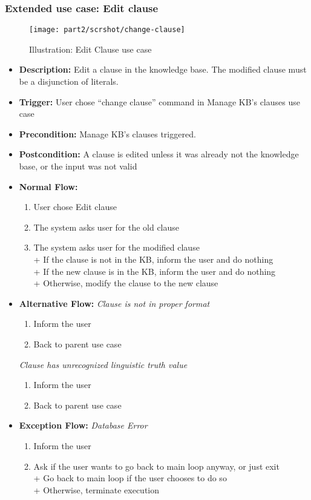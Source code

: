 \documentclass[../gr-final.tex]{subfiles}
\begin{document}
\subsubsection{Extended use case: Edit clause}
\begin{figure}[H]
  \centering
  \texttt{[image: part2/scrshot/change-clause]}
  \caption{Illustration: Edit Clause use case}
\end{figure}
\begin{itemize}
  \item {\bfseries Description:} Edit a clause in the
    knowledge base. The modified clause must be a disjunction of literals.
  \item {\bfseries Trigger:} User chose ``change clause'' command in
    Manage KB's clauses use case
  \item {\bfseries Precondition:} Manage KB's clauses triggered.
  \item {\bfseries Postcondition:} A clause is edited unless it
    was already not the knowledge base, or the input was not
    valid
  \item {\bfseries Normal Flow:}
    \begin{enumerate}
      \item User chose Edit clause
      \item The system asks user for the old clause\\
      \item The system asks user for the modified clause\\
        \indent + If the clause is not in the KB, inform the
        user and do nothing   \\
        \indent + If the new clause is in the KB, inform the user
        and do nothing\\
        \indent + Otherwise, modify the clause to the new clause        
    \end{enumerate}
  \item {\bfseries Alternative Flow:}
    {\em Clause is not in proper format}
    \begin{enumerate}
      \item Inform the user
      \item Back to parent use case
    \end{enumerate}
    {\em Clause has unrecognized linguistic truth value}
    \begin{enumerate}
      \item Inform the user
      \item Back to parent use case
    \end{enumerate}
  \item {\bfseries Exception Flow:}
    {\em Database Error}
    \begin{enumerate}
      \item Inform the user
      \item Ask if the user wants to go back to main loop anyway,
        or just exit\\
        \indent + Go back to main loop if the user chooses to do
        so\\
        \indent + Otherwise, terminate execution
    \end{enumerate}
\end{itemize}
\end{document}
